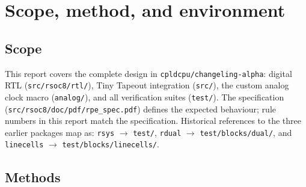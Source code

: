 \documentclass[10pt,a4paper]{article}
\begin{document}
{\small\tableofcontents}

\section{Scope, method, and environment}

\subsection{Scope}

This report covers the complete design in \texttt{cpldcpu/changeling-alpha}: digital RTL (\texttt{src/rsoc8/rtl/}),
Tiny Tapeout integration (\texttt{src/}), the custom analog clock macro (\texttt{analog/}), and all verification
suites (\texttt{test/}). The specification (\texttt{src/rsoc8/doc/pdf/rpe\_spec.pdf}) defines the expected
behaviour; rule numbers in this report match the specification. Historical references to the three earlier
packages map as: \texttt{rsys} $\to$ \texttt{test/}, \texttt{rdual} $\to$ \texttt{test/blocks/dual/}, and
\texttt{linecells} $\to$ \texttt{test/blocks/linecells/}.

\subsection{Methods}
\end{document}
